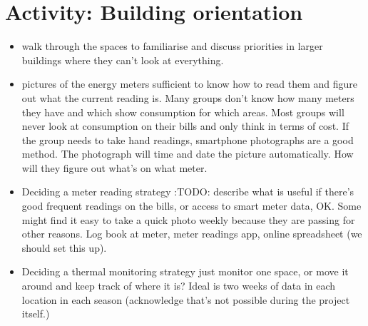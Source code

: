 \documentclass[letterpaper,10pt,english]{jupyterBook}
\begin{document}
\sphinxstepscope


\section{Activity:  Building orientation}
\label{\detokenize{session1/details/activity:activity-building-orientation}}\label{\detokenize{session1/details/activity::doc}}\begin{itemize}
\item {} 
\sphinxAtStartPar
walk through the spaces to familiarise and discuss priorities in larger buildings where they can’t look at everything.

\item {} 
\sphinxAtStartPar
pictures of the energy meters sufficient to know how to read them and figure out what the current reading is.  Many groups don’t know how many meters they have and which show consumption for which areas.  Most groups will never look at consumption on their bills and only think in terms of cost.  If the group needs to take hand readings, smartphone photographs are a good method.  The photograph will time and date the picture automatically. How will they figure out what’s on what meter.

\item {} 
\sphinxAtStartPar
Deciding a meter reading strategy \sphinxhyphen{}  :TODO: describe what is useful \sphinxhyphen{}  if there’s good frequent readings on the bills, or access to smart meter data, OK.  Some might find it easy to take a quick photo weekly because they are passing for other reasons.  Log book at meter, meter readings app, online spreadsheet (we should set this up).

\item {} 
\sphinxAtStartPar
Deciding a thermal monitoring strategy \sphinxhyphen{} just monitor one space, or move it around and keep track of where it is?  Ideal is two weeks of data in each location in each season (acknowledge that’s not possible during the project itself.)

\end{itemize}
\end{document}
